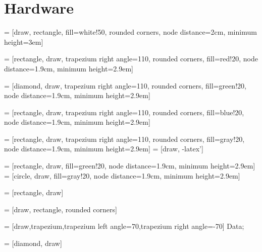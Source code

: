 \documentclass{report}
\begin{document}
\chapter*{Hardware}

 = [draw, rectangle, fill=white!50, rounded corners, node distance=2cm, 
                    minimum height=3em] 
                    
 = [rectangle, draw, trapezium right angle=110, rounded corners, 
                  fill=red!20, node distance=1.9cm, minimum height=2.9em] 

 = [diamond, draw, trapezium right angle=110, rounded corners, 
                  fill=green!20, node distance=1.9cm, minimum height=2.9em] 
                  
 = [rectangle, draw, trapezium right angle=110, rounded corners, 
                  fill=blue!20, node distance=1.9cm, minimum height=2.9em] 

 = [rectangle, draw, trapezium right angle=110, rounded corners, 
                  fill=gray!20, node distance=1.9cm, minimum height=2.9em]
 = [draw, -latex']  

 = [rectangle, draw, fill=green!20, node distance=1.9cm, minimum height=2.9em]
 = [circle, draw, 
                  fill=gray!20, node distance=1.9cm, minimum height=2.9em]



 = [rectangle, draw]

 = [draw, rectangle, rounded corners] 

 = [draw,trapezium,trapezium left angle=70,trapezium right angle=-70] {Data};

 = [diamond, draw] 


\end{document}

